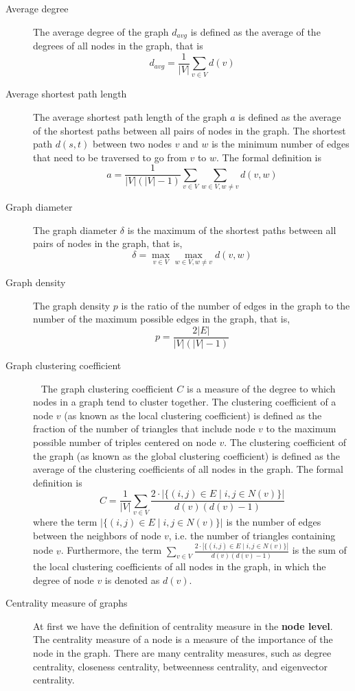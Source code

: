 \begin{description}
    \item [Average degree] The average degree of the graph $d_{avg}$ is defined as the average of the degrees of all nodes in the graph, that is
    $$ d_{avg} = \frac{1}{|V|} \sum_{v \in V} d(v)$$
    \item [Average shortest path length] The average shortest path length of the graph $a$ is defined as the average of the shortest paths between all pairs of nodes in the graph. The shortest path $d(s, t)$ between two nodes $v$ and $w$ is the minimum number of edges that need to be traversed to go from $v$ to $w$. The formal definition is
    $$
a = \frac{1}{|V|(|V|-1)} \sum_{v \in V} \sum_{w \in V, w \neq v} d(v, w)
    $$

     \item [Graph diameter] The graph diameter $\delta$ is the maximum of the shortest paths between all pairs of nodes in the graph, that is,
    $$
        \delta = \max_{v \in V} \max_{w \in V, w \neq v} d(v, w)
    $$

    \item [Graph density] The graph density $p$ is the ratio of the number of edges in the graph to the number of the maximum possible edges in the graph, that is,
    $$
p = \frac{2|E|}{|V|(|V|-1)}
    $$
    
    \item [Graph clustering coefficient]~\cite{luce1949method} The graph clustering coefficient $C$ is a measure of the degree to which nodes in a graph tend to cluster together. The clustering coefficient of a node $v$ (as known as the local clustering coefficient) is defined as the fraction of the number of triangles that include node $v$ to the maximum possible number of triples centered on node $v$. The clustering coefficient of the graph (as known as the global clustering coefficient) is defined as the average of the clustering coefficients of all nodes in the graph. The formal definition is
    $$
C = \frac{1}{|V|} \sum_{v \in V} \frac{2\cdot |\{(i,j)\in E \mid i, j \in N(v)\}|}{d(v)(d(v)-1)}
    $$
    where the term $|\{(i,j)\in E \mid i, j \in N(v)\}|$ is the number of edges between the neighbors of node $v$, i.e. the number of triangles containing node $v$. Furthermore, the term $\sum_{v \in V} \frac{2\cdot |\{(i,j)\in E \mid i, j \in N(v)\}|}{d(v)(d(v)-1)}$ is the sum of the local clustering coefficients of all nodes in the graph, in which the degree of node $v$ is denoted as $d(v)$.

    \item [Centrality measure of graphs] At first we have the definition of centrality measure in the \textbf{node level}. The centrality measure of a node is a measure of the importance of the node in the graph. There are many centrality measures, such as degree centrality, closeness centrality, betweenness centrality, and eigenvector centrality. 
    

\end{description}
